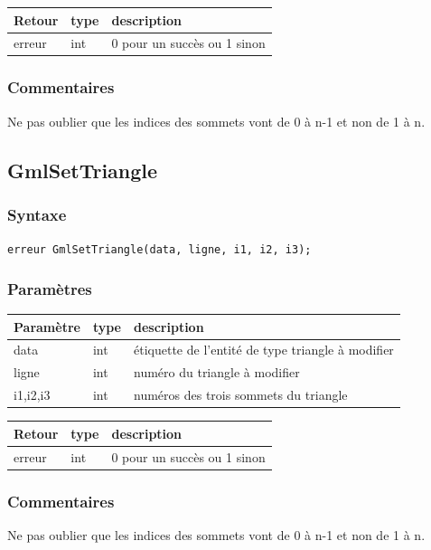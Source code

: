 \documentclass[a4paper,12pt]{article}
\begin{document}
\medskip

\begin{tabular}{|m{2cm}|m{1.5cm}|m{10.5cm}|}
\hline
Retour     & type   & description \\
\hline
erreur     & int    & 0 pour un succès ou 1 sinon \\
\hline
\end{tabular}
\subsubsection*{Commentaires}
Ne pas oublier que les indices des sommets vont de 0 à n-1 et non de 1 à n.


\subsection{GmlSetTriangle}
\subsubsection*{Syntaxe}
{\tt erreur GmlSetTriangle(data, ligne, i1, i2, i3);}
\subsubsection*{Paramètres}

\begin{tabular}{|m{2cm}|m{1.5cm}|m{10.5cm}|}
\hline
Paramètre  & type   & description \\
\hline
data       & int    & étiquette de l'entité de type triangle à modifier \\
\hline
ligne      & int    & numéro du triangle à modifier \\
\hline
i1,i2,i3   & int    & numéros des trois sommets du triangle \\
\hline
\end{tabular}

\medskip

\begin{tabular}{|m{2cm}|m{1.5cm}|m{10.5cm}|}
\hline
Retour     & type   & description \\
\hline
erreur     & int    & 0 pour un succès ou 1 sinon \\
\hline
\end{tabular}
\subsubsection*{Commentaires}
Ne pas oublier que les indices des sommets vont de 0 à n-1 et non de 1 à n.
\end{document}
